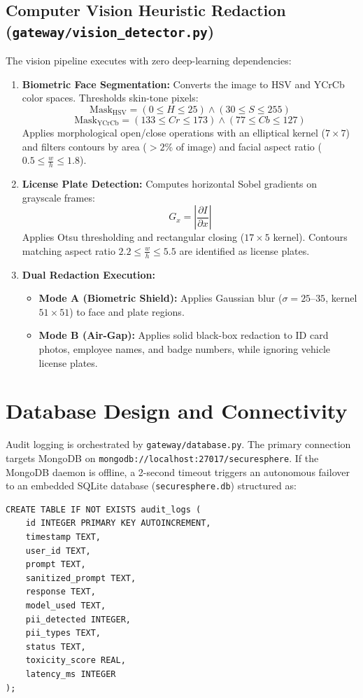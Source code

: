 \subsection{Computer Vision Heuristic Redaction (\texttt{gateway/vision\_detector.py})}
The vision pipeline executes with zero deep-learning dependencies:
\begin{enumerate}[leftmargin=*]
    \item \textbf{Biometric Face Segmentation:} Converts the image to HSV and YCrCb color spaces. Thresholds skin-tone pixels:
    \begin{equation}
    \text{Mask}_{\text{HSV}} = (0 \le H \le 25) \land (30 \le S \le 255)
    \end{equation}
    \begin{equation}
    \text{Mask}_{\text{YCrCb}} = (133 \le Cr \le 173) \land (77 \le Cb \le 127)
    \end{equation}
    Applies morphological open/close operations with an elliptical kernel ($7 \times 7$) and filters contours by area ($>2\%$ of image) and facial aspect ratio ($0.5 \le \frac{w}{h} \le 1.8$).
    \item \textbf{License Plate Detection:} Computes horizontal Sobel gradients on grayscale frames:
    \begin{equation}
    G_x = \left| \frac{\partial I}{\partial x} \right|
    \end{equation}
    Applies Otsu thresholding and rectangular closing ($17 \times 5$ kernel). Contours matching aspect ratio $2.2 \le \frac{w}{h} \le 5.5$ are identified as license plates.
    \item \textbf{Dual Redaction Execution:}
    \begin{itemize}
        \item \textbf{Mode A (Biometric Shield):} Applies Gaussian blur ($\sigma = 25$--$35$, kernel $51 \times 51$) to face and plate regions.
        \item \textbf{Mode B (Air-Gap):} Applies solid black-box redaction to ID card photos, employee names, and badge numbers, while ignoring vehicle license plates.
    \end{itemize}
\end{enumerate}

\section{Database Design and Connectivity}
Audit logging is orchestrated by \texttt{gateway/database.py}. The primary connection targets MongoDB on \texttt{mongodb://localhost:27017/securesphere}. If the MongoDB daemon is offline, a 2-second timeout triggers an autonomous failover to an embedded SQLite database (\texttt{securesphere.db}) structured as:
\begin{verbatim}
CREATE TABLE IF NOT EXISTS audit_logs (
    id INTEGER PRIMARY KEY AUTOINCREMENT,
    timestamp TEXT,
    user_id TEXT,
    prompt TEXT,
    sanitized_prompt TEXT,
    response TEXT,
    model_used TEXT,
    pii_detected INTEGER,
    pii_types TEXT,
    status TEXT,
    toxicity_score REAL,
    latency_ms INTEGER
);
\end{verbatim}

